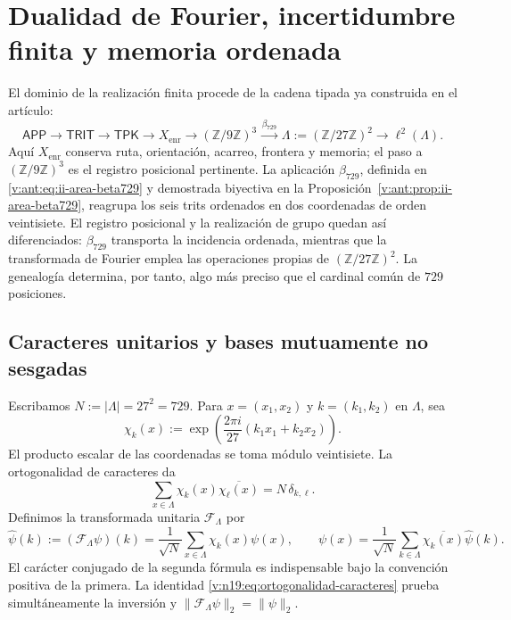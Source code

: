 \section{Dualidad de Fourier, incertidumbre finita y memoria ordenada}
\label{v:n19:sec:incertidumbre-fourier}

El dominio de la realización finita procede de la cadena tipada ya
construida en el artículo:
\begin{equation}
 \mathsf{APP}\longrightarrow\mathsf{TRIT}\longrightarrow\mathsf{TPK}
 \longrightarrow X_{\mathrm{enr}}
 \longrightarrow (\mathbb Z/9\mathbb Z)^3
 \xrightarrow{\,\beta_{729}\,}
 \Lambda:=(\mathbb Z/27\mathbb Z)^2
 \longrightarrow \ell^2(\Lambda).
 \label{v:n19:eq:cadena-tipificada}
\end{equation}
Aquí \(X_{\mathrm{enr}}\) conserva ruta, orientación, acarreo, frontera y
memoria; el paso a \((\mathbb Z/9\mathbb Z)^3\) es el registro posicional
pertinente. La aplicación \(\beta_{729}\), definida en
\eqref{v:ant:eq:ii-area-beta729} y demostrada biyectiva en la
Proposición~\ref{v:ant:prop:ii-area-beta729}, reagrupa los seis trits
ordenados en dos coordenadas de orden veintisiete. El registro posicional
y la realización de grupo quedan así diferenciados: \(\beta_{729}\)
transporta la incidencia ordenada, mientras que la transformada de
Fourier emplea las operaciones propias de
\((\mathbb Z/27\mathbb Z)^2\). La genealogía determina, por tanto, algo
más preciso que el cardinal común de \(729\) posiciones.

\subsection{Caracteres unitarios y bases mutuamente no sesgadas}
\label{v:n19:sec:caracteres-mub}

Escribamos \(N:=|\Lambda|=27^2=729\). Para
\(x=(x_1,x_2)\) y \(k=(k_1,k_2)\) en \(\Lambda\), sea
\begin{equation}
 \chi_k(x):=
 \exp\!\left(\frac{2\pi i}{27}(k_1x_1+k_2x_2)\right).
 \label{v:n19:eq:caracteres}
\end{equation}
El producto escalar de las coordenadas se toma módulo veintisiete. La
ortogonalidad de caracteres da
\begin{equation}
 \sum_{x\in\Lambda}\chi_k(x)\overline{\chi_{\ell}(x)}
 =N\,\delta_{k,\ell}.
 \label{v:n19:eq:ortogonalidad-caracteres}
\end{equation}
Definimos la transformada unitaria \(\mathcal F_\Lambda\) por
\begin{equation}
 \widehat\psi(k):=(\mathcal F_\Lambda\psi)(k)
 =\frac1{\sqrt N}\sum_{x\in\Lambda}\chi_k(x)\psi(x),
 \qquad
 \psi(x)=\frac1{\sqrt N}\sum_{k\in\Lambda}
 \overline{\chi_k(x)}\widehat\psi(k).
 \label{v:n19:eq:fourier-inversion}
\end{equation}
El carácter conjugado de la segunda fórmula es indispensable bajo la
convención positiva de la primera. La identidad
\eqref{v:n19:eq:ortogonalidad-caracteres} prueba simultáneamente la
inversión y \(\|\mathcal F_\Lambda\psi\|_2=\|\psi\|_2\).


